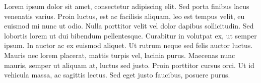 \abstract

Lorem ipsum dolor sit amet, consectetur adipiscing elit. Sed porta finibus lacus venenatis varius. Proin luctus, est ac facilisis aliquam, leo est tempus velit, eu euismod mi nunc ut odio. Nulla porttitor velit vel dolor dapibus sollicitudin. Sed lobortis lorem ut dui bibendum pellentesque. Curabitur in volutpat ex, ut semper ipsum. In auctor ac ex euismod aliquet. Ut rutrum neque sed felis auctor luctus. Mauris nec lorem placerat, mattis turpis vel, lacinia purus. Maecenas nunc mauris, semper ut aliquam at, luctus sed justo. Proin porttitor cursus orci. Ut id vehicula massa, ac sagittis lectus. Sed eget justo faucibus, posuere purus.

